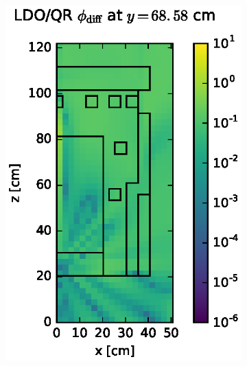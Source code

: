 \documentclass{article} %
\begin{document}
\begin{figure}[!hbt]
\centering
\begin{subfigure}{0.4\textwidth}
\includegraphics[max height=0.445\textheight]
{dlvn-flux-diff-qr.eps}
\end{subfigure} ~
\begin{subfigure}{0.4\textwidth}

\end{subfigure}
\end{figure}
\end{document}

